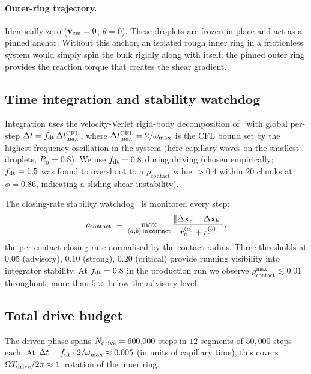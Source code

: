 \documentclass[aps,pre,twocolumn,floatfix,longbibliography]{revtex4-2}
\newcommand{\rc}{r_{\mathrm{c}}}
\newcommand{\dt}{\Delta t}
\newcommand{\rhoc}{\rho_{\mathrm{contact}}}
\begin{document}
\paragraph*{Outer-ring trajectory.}  Identically zero
($\mathbf v_{\rm cm} = 0$, $\dot\theta = 0$).  These droplets
are frozen in place and act as a pinned anchor.  Without this anchor,
an isolated rough inner ring in a frictionless system would simply
spin the bulk rigidly along with itself; the pinned outer ring
provides the reaction torque that creates the shear gradient.

\subsection{Time integration and stability watchdog}
Integration uses the velocity-Verlet rigid-body decomposition
of~\cite{epd_methods} with global per-step $\dt = f_{\rm dt}\,
\dt^{\rm CFL}_{\max}$, where $\dt^{\rm CFL}_{\max} = 2/\omega_{\max}$
is the CFL bound set by the highest-frequency oscillation
in the system (here capillary waves on the smallest droplets,
$R_0 = 0.8$).  We use $f_{\rm dt} = 0.8$ during driving (chosen
empirically; $f_{\rm dt} = 1.5$ was found to overshoot to a
$\rhoc$ value $> 0.4$ within $20$ chunks at $\phi = 0.86$, indicating
a sliding-shear instability).

The closing-rate stability watchdog~\cite{epd_methods}
is monitored every step:
\begin{equation}
\rhoc \;=\; \max_{(a,b)\,{\rm in\,contact}}
   \frac{\| \Delta\mathbf x_a - \Delta\mathbf x_b \|}{\rc^{(a)} + \rc^{(b)}},
\label{eq:rho_contact}
\end{equation}
the per-contact closing rate normalised by the contact radius.
Three thresholds at $0.05$ (advisory), $0.10$ (strong), $0.20$
(critical) provide running visibility into integrator stability.
At $f_{\rm dt} = 0.8$ in the production run we observe
$\rhoc^{\max} \lesssim 0.01$ throughout, more than $5\times$ below
the advisory level.

\subsection{Total drive budget}
The driven phase spans $N_{\rm drive} = 600{,}000$ steps in
$12$ segments of $50{,}000$ steps each.  At $\dt = f_{\rm dt} \cdot
2 / \omega_{\max} \approx 0.005$ (in units of capillary time), this
covers $\Omega T_{\rm drive} / 2\pi \approx 1$~rotation of the inner
ring.

\end{document}
